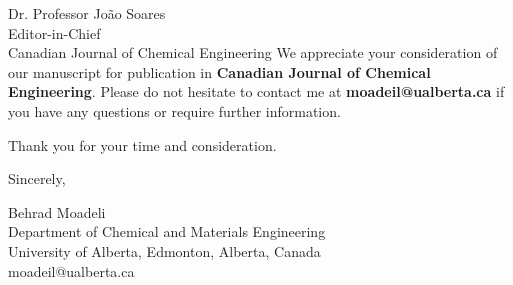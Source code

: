 \documentclass[11pt]{letter}
\begin{document}
\begin{letter}{Dr. Professor João Soares \\
Editor-in-Chief \\
Canadian Journal of Chemical Engineering}
We appreciate your consideration of our manuscript for publication in \textbf{Canadian Journal of Chemical Engineering}. Please do not hesitate to contact me at \textbf{moadeil@ualberta.ca} if you have any questions or require further information.

Thank you for your time and consideration.

\closing{Sincerely,}

\vspace{-4em} %

Behrad Moadeli \\
Department of Chemical and Materials Engineering \\
University of Alberta, Edmonton, Alberta, Canada \\
moadeil@ualberta.ca

\end{letter}
\end{document}
